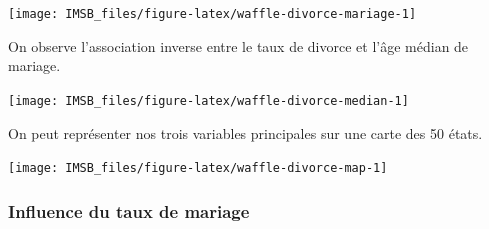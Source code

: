 \documentclass[
  a4paper,11pt,twoside,onecolumn,openright,final,oldfontcommands]{memoir}
\newenvironment{Shaded}{\begin{snugshade}}{\end{snugshade}}
\newcommand{\AttributeTok}[1]{\textcolor[rgb]{0.77,0.63,0.00}{#1}}
\newcommand{\ConstantTok}[1]{\textcolor[rgb]{0.00,0.00,0.00}{#1}}
\newcommand{\DecValTok}[1]{\textcolor[rgb]{0.00,0.00,0.81}{#1}}
\newcommand{\FloatTok}[1]{\textcolor[rgb]{0.00,0.00,0.81}{#1}}
\newcommand{\FunctionTok}[1]{\textcolor[rgb]{0.00,0.00,0.00}{#1}}
\newcommand{\NormalTok}[1]{#1}
\newcommand{\OtherTok}[1]{\textcolor[rgb]{0.56,0.35,0.01}{#1}}
\newcommand{\SpecialCharTok}[1]{\textcolor[rgb]{0.00,0.00,0.00}{#1}}
\newcommand{\StringTok}[1]{\textcolor[rgb]{0.31,0.60,0.02}{#1}}
\theoremstyle{definition}
\theoremstyle{definition}
\theoremstyle{definition}
\theoremstyle{definition}
\theoremstyle{remark}
\begin{document}
\begin{center}\texttt{[image: IMSB\_files/figure-latex/waffle-divorce-mariage-1]} \end{center}

On observe l'association inverse entre le taux de divorce et l'âge médian de mariage.

\begin{Shaded}
\end{Shaded}

\begin{center}\texttt{[image: IMSB\_files/figure-latex/waffle-divorce-median-1]} \end{center}

On peut représenter nos trois variables principales sur une carte des 50 états.

\begin{center}\texttt{[image: IMSB\_files/figure-latex/waffle-divorce-map-1]} \end{center}

\hypertarget{influence-du-taux-de-mariage}{%
\subsubsection{Influence du taux de mariage}\label{influence-du-taux-de-mariage}}
\end{document}
